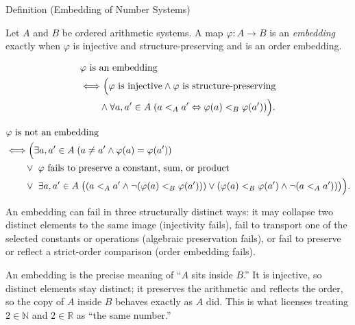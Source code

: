 \begin{definitionbox}{Definition (Embedding of Number Systems)}
\begin{definition}
\label{def:number-system-embedding}
Let $A$ and $B$ be ordered arithmetic systems. A map $\varphi:A\to B$ is an \emph{embedding} exactly when $\varphi$ is injective and structure-preserving and is an order embedding.
\end{definition}
\end{definitionbox}
\begin{remark*}
\[
\begin{aligned}
&\varphi \text{ is an embedding}\\
&\Longleftrightarrow \Bigl(\varphi \text{ is injective}\land \varphi \text{ is structure-preserving}\\
&\qquad\land \forall a,a'\in A\;(a<_A a'\Leftrightarrow\varphi(a)<_B\varphi(a'))\Bigr).
\end{aligned}
\]
\end{remark*}
\begin{remark*}
\[
\begin{aligned}
&\varphi \text{ is not an embedding}\\
&\Longleftrightarrow
\Bigl(\exists a,a'\in A\;(a\neq a'\land \varphi(a)=\varphi(a'))\\
&\qquad\lor\ \varphi \text{ fails to preserve a constant, sum, or product}\\
&\qquad\lor\ \exists a,a'\in A\;\bigl((a<_A a'\land \neg(\varphi(a)<_B\varphi(a')))
\lor(\varphi(a)<_B\varphi(a')\land \neg(a<_A a'))\bigr)\Bigr).
\end{aligned}
\]
\end{remark*}
\begin{remark*}
An embedding can fail in three structurally distinct ways: it may collapse two distinct elements to the same image (injectivity fails), fail to transport one of the selected constants or operations (algebraic preservation fails), or fail to preserve or reflect a strict-order comparison (order embedding fails).
\end{remark*}
\begin{remark*}[Interpretation]
An embedding is the precise meaning of ``$A$ sits inside $B$.'' It is injective, so distinct elements stay distinct; it preserves the arithmetic and reflects the order, so the copy of $A$ inside $B$ behaves exactly as $A$ did. This is what licenses treating $2\in\mathbb{N}$ and $2\in\mathbb{R}$ as ``the same number.''
\end{remark*}
